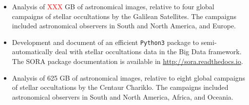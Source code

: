 \documentclass[10pt,a4paper,ragged2e,withhyper]{altacv}
\begin{document}
\begin{paracol}{2}


\begin{itemize}

    \item Analysis of \textcolor{red}{XXX} GB of astronomical images, relative to four global campaigns of stellar occultations by the Galilean Satellites. The campaigns included astronomical observers in South and North America, and Europe.
    

    
\end{itemize}

\divider

\begin{itemize}

    \item Development and document of an efficient \texttt{Python3} package to semi-automatically deal with stellar occultations data in the Big Data framework. The SORA package documentation is available in \underline{\url{http://sora.readthedocs.io}}.
    
    \item Analysis of 625 GB of astronomical images, relative to eight global campaigns of stellar occultations by the Centaur Chariklo. The campaigns included astronomical observers in South and North America, Africa, and Oceania.

\end{itemize}




\end{paracol}
\end{document}
